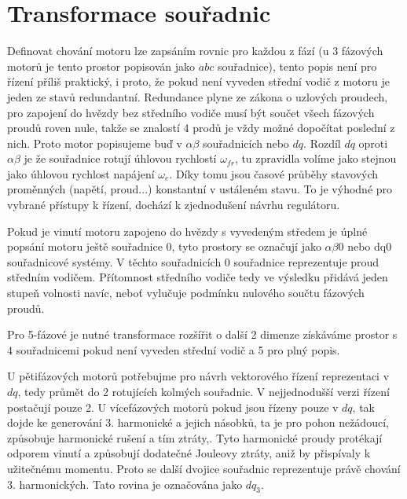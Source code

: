 \section{Transformace souřadnic}

Definovat chování motoru lze zapsáním rovnic pro každou z fází (u 3 fázových motorů je tento prostor popisován jako $abc$ souřadnice), tento popis není pro řízení příliš praktický, i proto, že pokud není vyveden střední vodič z motoru je jeden ze stavů redundantní. Redundance plyne ze zákona o uzlových proudech, pro zapojení do hvězdy bez středního vodiče musí být součet všech fázových proudů roven nule, takže se znalostí 4 prodů je vždy možné dopočítat poslední z nich. Proto motor popisujeme buď v $\alpha \beta $ souřadnicích nebo $dq$. Rozdíl $dq$ oproti $\alpha \beta$ je že souřadnice rotují úhlovou rychlostí $\omega_{fr}$, tu zpravidla volíme jako stejnou jako úhlovou rychlost napájení $\omega_e$. Díky tomu jsou časové průběhy stavových proměnných (napětí, proud...) konstantní v ustáleném stavu. To je výhodné pro vybrané přístupy k řízení, dochází k zjednodušení návrhu regulátoru.

Pokud je vinutí motoru zapojeno do hvězdy s vyvedeným středem je úplné popsání motoru ještě souřadnice 0, tyto prostory se označují jako  $\alpha \beta 0$  nebo dq0 souřadnicové systémy. V těchto souřadnicích  0 souřadnice reprezentuje proud středním vodičem. Přítomnost středního vodiče tedy ve výsledku přidává jeden stupeň volnosti navíc, neboť vylučuje podmínku nulového součtu fázových proudů.

Pro 5-fázové je nutné transformace rozšířit o další 2 dimenze získáváme prostor s  4 souřadnicemi pokud není vyveden střední vodič a 5 pro plný popis.



U pětifázových motorů potřebujme pro návrh vektorového řízení reprezentaci v $dq$, tedy průmět do 2 rotujících kolmých souřadnic. V nejjednodušší verzi řízení postačují pouze 2. U vícefázových motorů pokud jsou řízeny pouze v $dq$, tak dojde ke generování 3. harmonické a jejich násobků, ta je pro pohon nežádoucí, způsobuje harmonické rušení a tím ztráty\cite{letadla},\cite{analyseOfMultiphase}. Tyto harmonické proudy protékají odporem vinutí a způsobují dodatečné Jouleovy ztráty, aniž by přispívaly k užitečnému momentu. Proto se další dvojice souřadnic reprezentuje právě chování 3. harmonických. Tato rovina je označována jako $dq_3$.  



